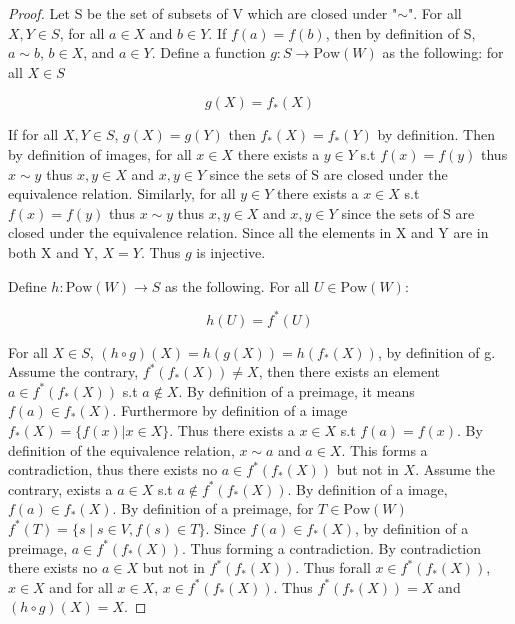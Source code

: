 \documentclass{article}
\newcommand{\rarr}[0]{\rightarrow}
\newcommand{\Pow}[1]{\text{Pow}(#1)}
\begin{document}
\begin{proof}
	Let S be the set of subsets of V which are closed under "$\sim$". For all $X, Y \in S$, for all $a \in X$ and $b \in Y$. If $f(a) = f(b)$, then by definition of S, $a \sim b$, $b \in X$, and $a \in Y$. Define a function $g: S \rarr \Pow{W}$ as the following: for all $X \in S$

	\begin{equation}{}
		g(X) = f_*(X)
	\end{equation}

	If for all $X, Y \in S$, $g(X) = g(Y)$ then $f_*(X) = f_*(Y)$ by definition. Then by definition of images, for all $x \in X$ there exists a $y \in Y$ s.t $f(x) = f(y)$ thus $x \sim y$ thus $x,y \in X$ and $x, y \in Y$ since the sets of S are closed under the equivalence relation. Similarly, for all $y \in Y$ there exists a $x \in X$ s.t $f(x) = f(y)$ thus $x \sim y$ thus $x,y \in X$ and $x, y \in Y$ since the sets of S are closed under the equivalence relation. Since all the elements in X and Y are in both X and Y, $X = Y$. Thus $g$ is injective.

	Define $h: \Pow{W} \rarr S$ as the following. For all $U \in \Pow{W}$:

	\begin{equation}{}
		h(U) = f^*(U)
	\end{equation}

	For all $X \in S$, $(h \circ g)(X) = h(g(X)) = h(f_*(X))$, by definition of g. Assume the contrary, $f^*(f_*(X)) \neq X$, then there exists an element $a \in f^*(f_*(X))$ s.t $a \not \in X$. By definition of a preimage, it means $f(a) \in f_*(X)$. Furthermore by definition of a image $f_*(X) = \{ f(x) | x \in X \}$. Thus there exists a $x \in X$ s.t $f(a) = f(x)$. By definition of the equivalence relation, $x \sim a$ and $a \in X$. This forms a contradiction, thus there exists no $a \in f^*(f_*(X))$ but not in $X$. Assume the contrary, exists a $a \in X$ s.t $a \not \in f^*(f_*(X))$. By definition of a image, $f(a) \in f_*(X)$. By definition of a preimage, for $T \in \Pow{W}$ $f^*(T) = \{s \mid s \in V, f(s) \in T\}$. Since $f(a) \in f_*(X)$, by definition of a preimage, $a \in f^*(f_*(X))$. Thus forming a contradiction. By contradiction there exists no $a \in X$ but not in $f^*(f_*(X))$. Thus forall $x \in f^*(f_*(X))$, $x \in X$ and for all $x \in X$, $x \in f^*(f_*(X))$. Thus $f^*(f_*(X)) = X$ and $(h \circ g)(X) = X$.


\end{proof}
\end{document}
